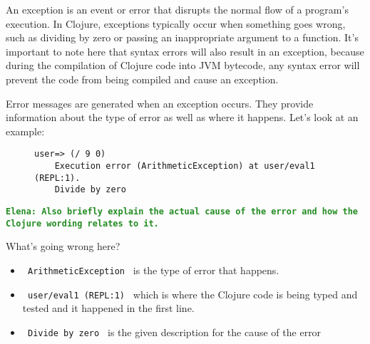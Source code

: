 \documentclass[12pt]{article}
\newcommand{\comment}[1]{{\bf \tt  {#1}}}
\newcommand{\emcomment}[1]{\textcolor{ForestGreen}{\comment{Elena: {#1}}}}
\begin{document}
   An exception is an event or error that disrupts the normal flow of a program’s execution. In Clojure, exceptions typically occur when something goes wrong, such as dividing by 
   zero or passing an inappropriate argument to a function. It’s important to note here that syntax errors will also result in an exception, because during the compilation of Clojure code into JVM bytecode, 
   any syntax error will prevent the code from being compiled and cause an exception.

   Error messages are generated when an exception occurs. They provide information about
   the type of error as well as where it happens. Let’s look at an example:

	\begin{figure}[h]
		\centering
		\begin{lstlisting}[breaklines=true, basicstyle=\ttfamily]
	user=> (/ 9 0)
	Execution error (ArithmeticException) at user/eval1 (REPL:1).
	Divide by zero
		\end{lstlisting}
	\end{figure}
\emcomment{Also briefly explain the actual cause of the error and how the Clojure wording relates to it.}	

What’s going wrong here?
	\begin{itemize}
		\item \texttt{ ArithmeticException } is the type of error that happens.
		\item \texttt{ user/eval1 (REPL:1) } which is where the Clojure code is being typed and tested and it happened in the first line.
		\item \texttt{ Divide by zero } is the given description for the cause of the error
	\end{itemize}
\end{document}
